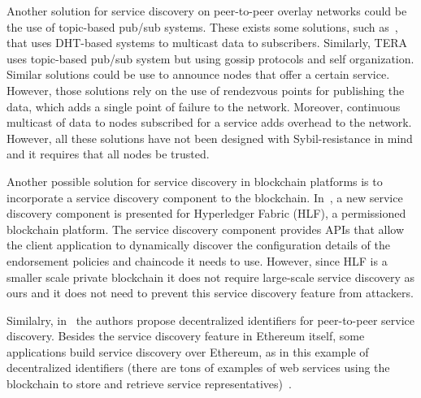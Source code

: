 Another solution for service discovery on peer-to-peer overlay networks could be the use of topic-based pub/sub systems. 
These exists some solutions,  such as~\cite{scribe,poldercast,banno2015}, that uses DHT-based systems to multicast data to subscribers.
Similarly, TERA~\cite{baldoni2007tera} uses topic-based pub/sub system
but using gossip protocols and self organization. 
Similar solutions could be use to announce nodes that offer a certain service.
However, those solutions rely on the use of rendezvous points for publishing the data,  which adds a single point of failure to the network.
Moreover, continuous multicast of data to nodes subscribed for a service adds overhead to the network.
However, all these solutions have not been designed with Sybil-resistance in mind and it requires that all nodes be trusted.



Another possible solution for service discovery in blockchain platforms is to incorporate a service discovery component to the blockchain. 
In~\cite{manevich2019endorsement}, a new service discovery component is presented for  Hyperledger Fabric (HLF), a permissioned blockchain platform.
The service discovery component provides APIs that allow the client application to dynamically discover the configuration details of the endorsement policies and chaincode it needs to use.
However, since HLF is a smaller scale private blockchain it does not require large-scale service discovery as ours and it does not need to prevent this service discovery feature from attackers.

Similalry, in~\cite{farmer2021decentralized} the authors propose decentralized identifiers for peer-to-peer service discovery.
Besides the service discovery feature in Ethereum itself, some applications build service discovery over Ethereum, as in this example of decentralized identifiers (there are tons of examples of web services using the blockchain to store and retrieve service representatives)~\cite{keizer2021flock}.

